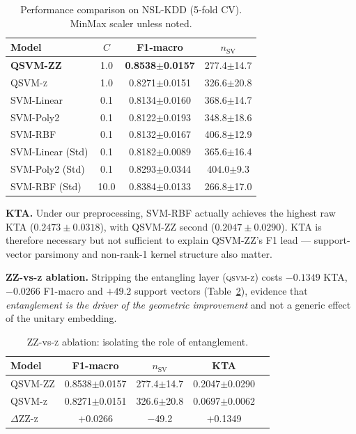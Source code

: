 \documentclass[journal]{IEEEtran}
\newcommand{\ZZ}{\textsc{ZZ}}
\newcommand{\QSVM}{QSVM-\ZZ}
\begin{document}
  \begin{table}[t]
  \centering
  \caption{Performance comparison on NSL-KDD (5-fold CV).
    MinMax scaler unless noted.}
  \label{tab:c3-perf}
  \small
  \begin{tabular}{lccc}
  \toprule
  Model & $C$ & F1-macro & $n_{\text{SV}}$\\\midrule
  \textbf{QSVM-\ZZ{}}  & 1.0  & \textbf{0.8538$\pm$0.0157} & 277.4$\pm$14.7\\
  QSVM-\textsc{z}      & 1.0  & 0.8271$\pm$0.0151 & 326.6$\pm$20.8\\
  SVM-Linear           & 0.1  & 0.8134$\pm$0.0160 & 368.6$\pm$14.7\\
  SVM-Poly2            & 0.1  & 0.8122$\pm$0.0193 & 348.8$\pm$18.6\\
  SVM-RBF              & 0.1  & 0.8132$\pm$0.0167 & 406.8$\pm$12.9\\
  SVM-Linear (Std)     & 0.1  & 0.8182$\pm$0.0089 & 365.6$\pm$16.4\\
  SVM-Poly2 (Std)      & 0.1  & 0.8293$\pm$0.0344 & 404.0$\pm$9.3\\
  SVM-RBF (Std)        & 10.0 & 0.8384$\pm$0.0133 & 266.8$\pm$17.0\\
  \bottomrule
  \end{tabular}
  \end{table}

  \textbf{KTA.} Under our preprocessing, SVM-RBF actually achieves the
  highest raw KTA ($0.2473{\pm}0.0318$), with \QSVM{} second
  ($0.2047{\pm}0.0290$). KTA is therefore necessary but not sufficient
  to explain \QSVM{}'s F1 lead --- support-vector parsimony and
  non-rank-1 kernel structure also matter.

  \textbf{\ZZ{}-vs-\textsc{z} ablation.} Stripping the entangling
  layer (\textsc{qsvm-z}) costs $-0.1349$ KTA, $-0.0266$ F1-macro and
  $+49.2$ support vectors (Table~\ref{tab:c3-zzvsz}), evidence that
  \emph{entanglement is the driver of the geometric improvement} and
  not a generic effect of the unitary embedding.

  \begin{table}[t]
  \centering
  \caption{\ZZ{}-vs-\textsc{z} ablation: isolating the role of
    entanglement.}
  \label{tab:c3-zzvsz}
  \small
  \begin{tabular}{lcccc}
  \toprule
  Model & F1-macro & $n_{\text{SV}}$ & KTA\\\midrule
  QSVM-\ZZ{}        & 0.8538$\pm$0.0157 & 277.4$\pm$14.7 & 0.2047$\pm$0.0290\\
  QSVM-\textsc{z}   & 0.8271$\pm$0.0151 & 326.6$\pm$20.8 & 0.0697$\pm$0.0062\\
  $\Delta$\ZZ-\textsc{z} & $+$0.0266 & $-$49.2 & $+$0.1349\\
  \bottomrule
  \end{tabular}
  \end{table}
\end{document}
